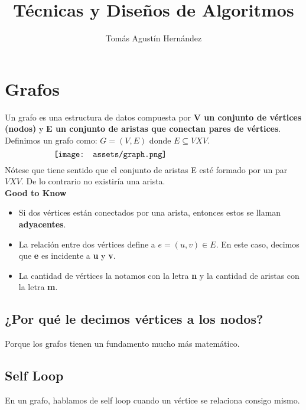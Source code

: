 \documentclass[10pt,a4paper]{article}
\title{Técnicas y Diseños de Algoritmos}
\author{Tomás Agustín Hernández}
\date{}
\begin{document}
\maketitle

\begin{figure}[b]
    \centering
\end{figure}
\newpage
\section*{Grafos}
Un grafo es una estructura de datos compuesta por \textbf{V un conjunto de vértices (nodos)} y \textbf{E un conjunto de aristas que conectan pares de vértices}. \\
Definimos un grafo como: $G = (V, E)$ donde $E \subseteq V X V$.
\[\begin{minipage}[b]{0.7\textwidth}
    \texttt{[image: assets/graph.png]}
\end{minipage}\]
Nótese que tiene sentido que el conjunto de aristas E esté formado por un par $V X V$. De lo contrario no existiría una arista. \\
\textbf{Good to Know} 
\begin{itemize}
    \item Si dos vértices están conectados por una arista, entonces estos se llaman \textbf{adyacentes}.
    \item La relación entre dos vértices define a $e = (u,v) \in E$. En este caso, decimos que \textbf{e} es incidente a \textbf{u} y \textbf{v}.
    \item La cantidad de vértices la notamos con la letra \textbf{n} y la cantidad de aristas con la letra \textbf{m}.
\end{itemize}
\subsection*{¿Por qué le decimos vértices a los nodos?}
Porque los grafos tienen un fundamento mucho más matemático.
\subsection*{Self Loop}
En un grafo, hablamos de self loop cuando un vértice se relaciona consigo mismo.
\end{document}
